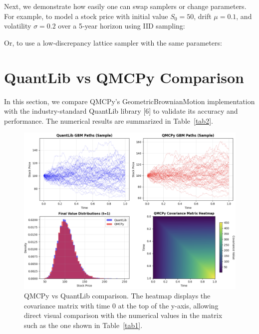 \documentclass{article}
\begin{document}
Next, we demonstrate how easily one can swap samplers or change parameters.  For example, to model a stock price
with initial value $S_0=50$, drift $\mu=0.1$, and volatility $\sigma=0.2$ over a 5‐year horizon using IID sampling:


Or, to use a low‐discrepancy lattice sampler with the same parameters:




\section{QuantLib vs QMCPy Comparison}

In this section, we compare QMCPy's GeometricBrownianMotion implementation with the industry-standard QuantLib library [6] to validate its accuracy and performance. The numerical results are summarized in Table~\ref{tab2}.



\begin{figure}[t!]
\centering
\includegraphics[width=1\textwidth]{images/figure_5.png}
\caption{QMCPy vs QuantLib comparison. The heatmap displays the covariance matrix with time 0 at the top of the y-axis, allowing direct visual comparison with the numerical values in the  matrix such as the one shown in Table~\ref{tab1}.}
\end{figure}
\end{document}
